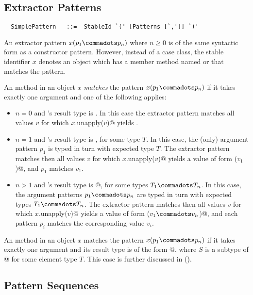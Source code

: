 \subsection{Extractor Patterns}\label{sec:extractor-patterns}

\syntax\begin{lstlisting}
  SimplePattern   ::=  StableId `(' [Patterns [`,']] `)'
\end{lstlisting}

An extractor pattern $x(p_1 \commadots p_n)$ where $n \geq 0$ is of
the same syntactic form as a constructor pattern. However, instead of
a case class, the stable identifier $x$ denotes an object which has a
member method named  or  that matches
the pattern.

An  method in an object $x$ {\em matches} the pattern
$x(p_1 \commadots p_n)$ if it takes exactly one argument and one of
the following applies:
\begin{itemize}
\item[]
$n=0$ and 's result type is . In this case
the extractor pattern matches all values $v$ for which 
\lstinline@$x$.unapply($v$)@ yields .
\item[]
$n=1$ and 's result type is , for some
type $T$.  In this case, the (only) argument pattern $p_1$ is typed in
turn with expected type $T$.  The extractor pattern matches then all
values $v$ for which \lstinline@$x$.unapply($v$)@ yields a value of form
\lstinline@Some($v_1$)@, and $p_1$ matches $v_1$.
\item[]
$n>1$ and 's result type is 
\lstinline@Option[{$T_1 \commadots T_n$}]@, for some
types $T_1 \commadots T_n$.  In this case, the argument patterns $p_1
\commadots p_n$ are typed in turn with expected types $T_1 \commadots
T_n$.  The extractor pattern matches then all values $v$ for which
\lstinline@$x$.unapply($v$)@ yields a value of form
\lstinline@Some({$v_1 \commadots v_n$})@, and each pattern
$p_i$ matches the corresponding value $v_i$.
\end{itemize}

An  method in an object $x$ matches the pattern
$x(p_1 \commadots p_n)$ if it takes exactly one argument and its
result type is of the form \lstinline@Option[$S$]@, where $S$ is a subtype of
\lstinline@Seq[$T$]@ for some element type $T$. 
This case is further discussed in ().

\subsection{Pattern Sequences}\label{sec:pattern-seqs}

